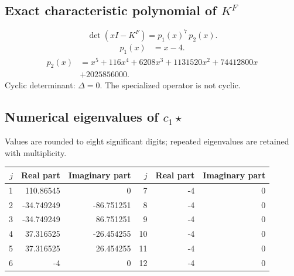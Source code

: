 \documentclass[10pt,a4paper]{article}
\begin{document}
\subsection*{Exact characteristic polynomial of $K^F$}
\[\det(xI-K^F)=p_{1}(x)^{7}\,p_{2}(x).\]
\[\begin{aligned}p_{1}(x)&=x - 4.\end{aligned}\]
\[\begin{aligned}p_{2}(x)&=x^{5} + 116 x^{4} + 6208 x^{3} + 1131520 x^{2} + 74412800 x\\&+2025856000.\end{aligned}\]
Cyclic determinant: $\Delta=0$. The specialized operator is not cyclic.
\subsection*{Numerical eigenvalues of $c_1\star$}
Values are rounded to eight significant digits; repeated eigenvalues are retained with multiplicity.
\begin{center}\small\begin{tabular}{rrr@{\qquad}rrr}\toprule $j$ & Real part & Imaginary part & $j$ & Real part & Imaginary part\\\midrule
1 & 110.86545 & 0 & 7 & -4 & 0\\
2 & -34.749249 & -86.751251 & 8 & -4 & 0\\
3 & -34.749249 & 86.751251 & 9 & -4 & 0\\
4 & 37.316525 & -26.454255 & 10 & -4 & 0\\
5 & 37.316525 & 26.454255 & 11 & -4 & 0\\
6 & -4 & 0 & 12 & -4 & 0\\
\bottomrule\end{tabular}\end{center}
\end{document}
